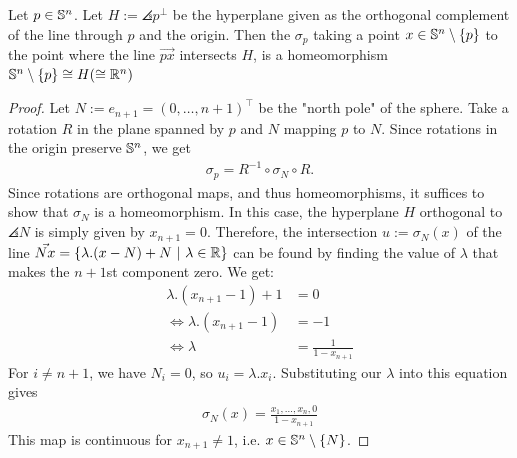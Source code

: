 \begin{theorem}
	Let $p \in \mathbb{S}^n$. Let $H := \angles{p}^\perp$ be the hyperplane given as the orthogonal complement of the line through $p$ and the origin. Then the  $\sigma_p$ taking a point $x \in \mathbb{S}^n \setminus \qty{p}$ to the point where the line $\vec{px}$ intersects $H$, is a homeomorphism $\mathbb{S}^n \setminus \qty{p} \cong H (\cong \mathbb{R}^n)$
\end{theorem}
\begin{proof}
	Let $N := e_{n+1} = (0, \hdots, n+1)^\top$ be the "north pole" of the sphere.
	Take a rotation $R$ in the plane spanned by $p$ and $N$ mapping $p$ to $N$. Since rotations in the origin preserve $\mathbb{S}^n$, we get
	\begin{align*}
		\sigma_p = R^{-1} \circ \sigma_N \circ R.
	\end{align*}
	Since rotations are orthogonal maps, and thus homeomorphisms, it suffices to show that $\sigma_N$ is a homeomorphism.
	\newpar
	In this case, the hyperplane $H$ orthogonal to $\angles{N}$ is simply given by $x_{n+1} = 0$. Therefore, the intersection $u := \sigma_N(x)$ of the line $\vec{Nx} = \qty{\lambda.(x - N) + N ~\middle|~\lambda \in \mathbb{R}}$ can be found by finding the value of $\lambda$ that makes the $n+1$st component zero. We get:
	\begin{align*}
		\lambda.(x_{n+1} - 1) + 1 &= 0\\
		\Leftrightarrow \lambda.(x_{n+1} - 1) &= -1\\
		\Leftrightarrow \lambda &= \frac{1}{1 - x_{n+1}}
	\end{align*}
	For $i \neq n+1$, we have $N_i = 0$, so $u_i = \lambda.x_i$. Substituting our $\lambda$ into this equation gives
	\begin{align*}
		\sigma_N(x) = \frac{x_1, \hdots, x_n, 0}{1 - x_{n+1}}
	\end{align*}
	This map is continuous for $x_{n+1} \neq 1$, i.e. $x \in \mathbb{S}^n \setminus \qty{N}$.
	

\end{proof}
